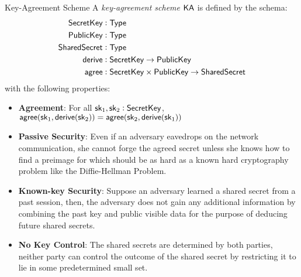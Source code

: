 \begin{definitiontoc}{Key-Agreement Scheme}
    A \emph{key-agreement scheme} ${\textsf{KA}}$ is defined by the schema:
    \begin{align*}
        {\textsf{SecretKey}}    &: {\textsf{Type}} \\
        {\textsf{PublicKey}}    &: {\textsf{Type}} \\
        {\textsf{SharedSecret}} &: {\textsf{Type}} \\
        {\textsf{derive}}       &: {\textsf{SecretKey}} \to {\textsf{PublicKey}} \\
        {\textsf{agree}}        &: {\textsf{SecretKey}} \times {\textsf{PublicKey}} \to {\textsf{SharedSecret}}
    \end{align*}
    with the following properties:
    \begin{itemize}
        \item \textbf{Agreement}: For all ${\textsf{sk}}_1, {\textsf{sk}}_2 : {\textsf{SecretKey}}$, ${\textsf{agree}}({\textsf{sk}}_1, {\textsf{derive}}({\textsf{sk}}_2)) = {\textsf{agree}}({\textsf{sk}}_2, {\textsf{derive}}({\textsf{sk}}_1))$
        \item \textbf{Passive Security}: Even if an adversary eavedrops on the network communication, she cannot forge the agreed secret unless she knows how to find a preimage for \derive{} which should be as hard as a known hard cryptography problem like the Diffie-Hellman Problem.
        \item \textbf{Known-key Security}: Suppose an adversary learned a shared secret from a past session, then, the adversary does not gain any additional information by combining the past key and public visible data for the purpose of deducing future shared secrets.
        \item \textbf{No Key Control}: The shared secrets are determined by both parties, neither party can control the outcome of the shared secret by restricting it to lie in some predetermined small set.
    \end{itemize}
\end{definitiontoc}

